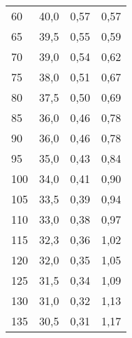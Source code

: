 \documentclass{article}
\begin{document}
\begin{tabular}{llll}
	60             & 40,0                         & 0,57                                                                 & 0,57     \\
	65             & 39,5                         & 0,55                                                                 & 0,59     \\
	70             & 39,0                         & 0,54                                                                 & 0,62     \\
	75             & 38,0                         & 0,51                                                                 & 0,67     \\
	80             & 37,5                         & 0,50                                                                 & 0,69     \\
	85             & 36,0                         & 0,46                                                                 & 0,78     \\
	90             & 36,0                         & 0,46                                                                 & 0,78     \\
	95             & 35,0                         & 0,43                                                                 & 0,84     \\
	100            & 34,0                         & 0,41                                                                 & 0,90     \\
	105            & 33,5                         & 0,39                                                                 & 0,94     \\
	110            & 33,0                         & 0,38                                                                 & 0,97     \\
	115            & 32,3                         & 0,36                                                                 & 1,02     \\
	120            & 32,0                         & 0,35                                                                 & 1,05     \\
	125            & 31,5                         & 0,34                                                                 & 1,09     \\
	130            & 31,0                         & 0,32                                                                 & 1,13     \\
	135            & 30,5                         & 0,31                                                                 & 1,17     \\

\end{tabular}
\end{document}
